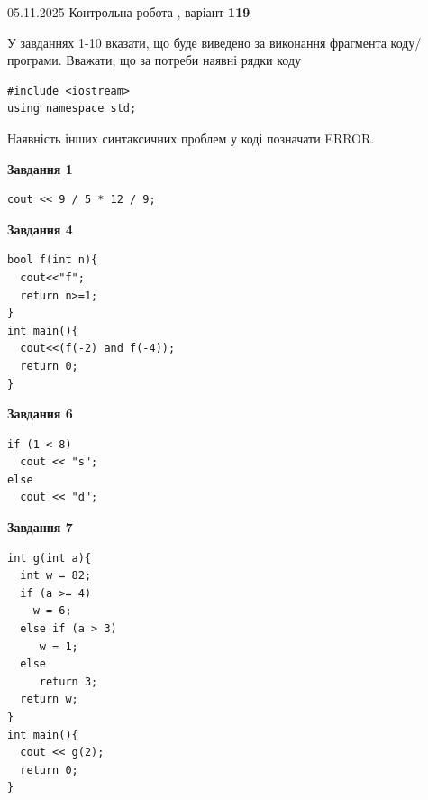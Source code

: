 \documentclass[12pt, ukrainian]{article}
\begin{document}
{\Large{05.11.2025 Контрольна робота , варіант  \No \textbf { 119 }\par}}
{
\begin {large}
У завданнях 1-10 вказати, що буде виведено за виконання фрагмента коду/про\-гра\-ми.
Вважати, що за потреби наявні рядки коду
\begin{verbatim}
#include <iostream>
using namespace std;
\end{verbatim}
Наявність інших синтаксичних проблем у коді позначати ERROR.

\begin{minipage}[t]{7.0cm}

\begin{center}
\textbf{Завдання 1}
\end{center}
\vspace{-8mm}

\begin{verbatim}
cout << 9 / 5 * 12 / 9;
\end{verbatim}



\begin{center}
\textbf{Завдання 4}
\end{center}
\vspace{-8mm}

\begin{verbatim}
bool f(int n){
  cout<<"f";
  return n>=1;
}
int main(){
  cout<<(f(-2) and f(-4));
  return 0;
}
\end{verbatim}



\begin{center}
\textbf{Завдання 6}
\end{center}
\vspace{-8mm}

\begin{verbatim}
if (1 < 8)
  cout << "s";
else
  cout << "d";
\end{verbatim}



\begin{center}
\textbf{Завдання 7}
\end{center}
\vspace{-8mm}

\begin{verbatim}
int g(int a){
  int w = 82;
  if (a >= 4)
    w = 6;
  else if (a > 3)
     w = 1;
  else
     return 3;
  return w;
}
int main(){
  cout << g(2);
  return 0;
}
\end{verbatim}


\end{minipage}
\end{large}}
\end{document}
